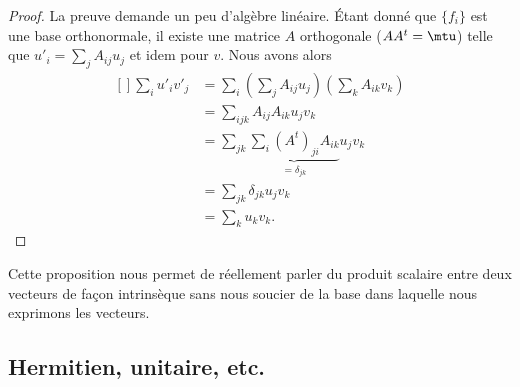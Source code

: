 \begin{proof}
	La preuve demande un peu d'algèbre linéaire. Étant donné que \( \{ f_i \}\) est une base orthonormale, il existe une matrice \( A\) orthogonale (\( AA^t=\mtu\)) telle que \( u'_i=\sum_jA_{ij}u_j\) et idem pour \( v\). Nous avons alors
	\begin{equation}
		\begin{aligned}[]
			\sum_iu'_iv'_j & =\sum_i\left( \sum_jA_{ij} u_j\right)\left( \sum_k A_{ik}v_k \right) \\
			               & =\sum_{ijk}A_{ij}A_{ik}u_jv_k                                        \\
			               & =\sum_{jk}\underbrace{\sum_i(A^t)_{ji}A_{ik}}_{=\delta_{jk}}u_jv_k   \\
			               & =\sum_{jk}\delta_{jk}u_jv_k                                          \\
			               & =\sum_ku_kv_k.
		\end{aligned}
	\end{equation}
\end{proof}

Cette proposition nous permet de réellement parler du produit scalaire entre deux vecteurs de façon intrinsèque sans nous soucier de la base dans laquelle nous exprimons les vecteurs.

\subsection{Hermitien, unitaire, etc.}

